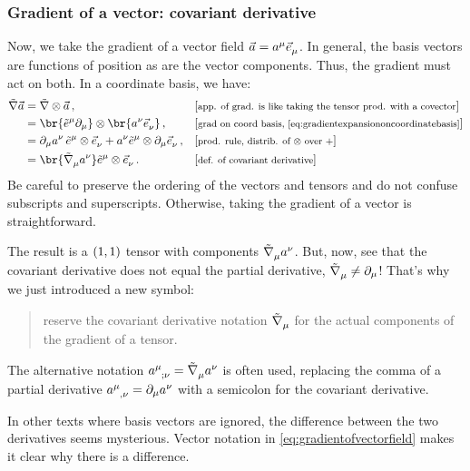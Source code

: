 \subsubsection{Gradient of a vector: covariant derivative}
%
Now, we take the gradient of a vector field $\vec a = \tvec a\mu\tbvec\mu$. In general, the basis vectors are functions of position as are the vector components. Thus, the gradient must act on both. In a coordinate basis, we have:
%
\begin{align}\label{eq:gradientofvectorfield}
  \gradcov\vec a &= \gradcov\tprod\vec a \,,
                  && \eqtxt{app. of grad. is like taking the tensor prod. with a covector}\\\nonumber
                &= \br{\tbcov\mu\ipd\mu}\tprod\br{\tvec a\nu\tbvec\nu} \,,
                  && \eqtxt{grad on coord basis, \cref{eq:gradientexpansiononcoordinatebasis}}\\\nonumber
                &= \ipd\mu\tvec a\nu\,\tbcov\mu\tprod\tbvec\nu + \tvec a\nu\tbcov\mu\tprod\ipd\mu\tbvec\nu \,,
                  && \eqtxt{prod. rule, distrib. of $\tprod$ over $+$}\\\nonumber
                &= \br{\tgradcov\mu\tvec a\nu}\tbcov\mu\tprod\tbvec\nu\,.
                  && \eqtxt{def. of covariant derivative}
\end{align}
%
 Be careful to preserve the ordering of the vectors and tensors and do not confuse subscripts and superscripts. Otherwise, taking the gradient of a vector is straightforward.

 The result is a $\torder 11$ tensor with components $\tgradcov\mu\tvec a\nu$. But, now, see that the covariant derivative does not equal the partial derivative, $\tgradcov\mu\neq\ipd\mu$! That's why we just introduced a new symbol:
%
\begin{quotation}
  reserve the covariant derivative notation $\tgradcov\mu$ for the actual components of the gradient of a tensor.
\end{quotation}

 The alternative notation $\tensor{a}{^\mu_{;\nu}} = \tgradcov\mu\tvec a\nu$ is often used, replacing the comma of a partial derivative $\tensor{a}{^\mu_{,\nu}} = \ipd\mu\tvec a\nu$ with a semicolon for the covariant derivative.

 In other texts where basis vectors are ignored, the difference between the two derivatives seems mysterious. Vector notation in \cref{eq:gradientofvectorfield} makes it clear why there is a difference.

